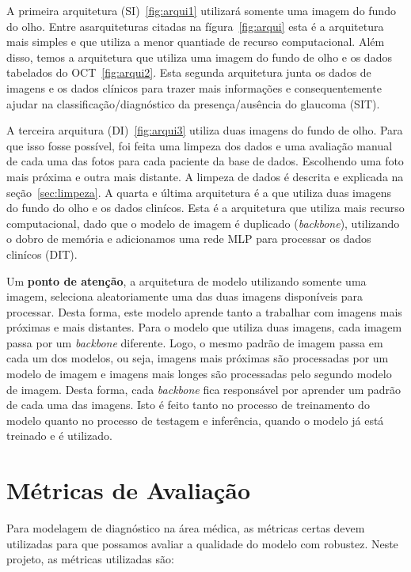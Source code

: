 \documentclass[ %
	msc, %
	portugues %
]{../ppgccufmg}
\begin{document}
    A primeira arquitetura (SI)~\ref{fig:arqui1} utilizará somente uma imagem do fundo do olho. Entre
    asarquiteturas citadas na fígura~\ref{fig:arqui} esta é a arquitetura mais simples e que utiliza a menor quantiade de
    recurso computacional. Além disso, temos a arquitetura que utiliza uma imagem do fundo de olho e
    os dados tabelados do OCT~\ref{fig:arqui2}. Esta segunda arquitetura junta os dados de imagens e os dados
    clínicos para trazer mais informações e consequentemente ajudar na classificação/diagnóstico da
    presença/ausência do glaucoma (SIT).

    A terceira arquitura (DI)~\ref{fig:arqui3} utiliza duas imagens do fundo de olho. Para que isso fosse possível, foi
    feita uma limpeza dos dados e uma avaliação manual de cada uma das fotos para cada paciente da
    base de dados. Escolhendo uma foto mais próxima e outra mais distante.
    A limpeza de dados é descrita e explicada na seção~\ref{sec:limpeza}. A quarta e última
    arquitetura é a que utiliza duas imagens do fundo do olho e os dados clinícos. Esta é a
    arquitetura que utiliza mais recurso computacional, dado que o modelo de imagem é
    duplicado (\textit{backbone}), utilizando o dobro de memória e adicionamos uma rede
    MLP para processar os dados clinícos (DIT).

    Um \textbf{ponto de atenção}, a arquitetura de modelo utilizando somente uma imagem, seleciona
    aleatoriamente uma das duas imagens disponíveis para processar. Desta forma, este modelo aprende
    tanto a trabalhar com imagens mais próximas e mais distantes. Para o modelo que utiliza duas
    imagens, cada imagem passa por um \textit{backbone} diferente. Logo, o mesmo padrão de imagem passa em cada
    um dos modelos, ou seja, imagens mais próximas são processadas por um modelo de imagem e imagens
    mais longes são processadas pelo segundo modelo de imagem.  Desta forma, cada \textit{backbone}
    fica responsável por aprender um padrão de cada uma das imagens. Isto é feito tanto no processo
    de treinamento do modelo quanto no processo de testagem e inferência, quando o modelo já está
    treinado e é utilizado.

    \section{Métricas de Avaliação}
    \label{sec:metrics}

    Para modelagem de diagnóstico na área médica, as métricas certas devem utilizadas para que
    possamos avaliar a qualidade do modelo com robustez. Neste projeto, as métricas utilizadas são:
\end{document}
